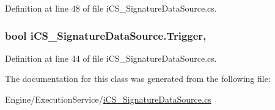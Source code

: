 Definition at line 48 of file i\+C\+S\+\_\+\+Signature\+Data\+Source.\+cs.

\hypertarget{classi_c_s___signature_data_source_aac81c2d89f3e82d102075980d0ec2cd1}{
\subsubsection[{Trigger}]{\setlength{\rightskip}{0pt plus 5cm}bool i\+C\+S\+\_\+\+Signature\+Data\+Source.\+Trigger\hspace{0.3cm}{\ttfamily [get]}, {\ttfamily [set]}}}\label{classi_c_s___signature_data_source_aac81c2d89f3e82d102075980d0ec2cd1}


Definition at line 44 of file i\+C\+S\+\_\+\+Signature\+Data\+Source.\+cs.



The documentation for this class was generated from the following file\+:\begin{DoxyCompactItemize}
\item 
Engine/\+Execution\+Service/\hyperlink{i_c_s___signature_data_source_8cs}{i\+C\+S\+\_\+\+Signature\+Data\+Source.\+cs}\end{DoxyCompactItemize}
